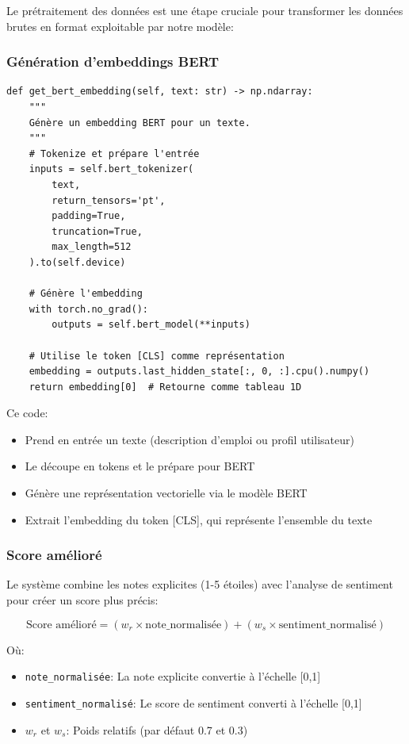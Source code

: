 \documentclass[12pt,a4paper]{article}
\begin{document}
Le prétraitement des données est une étape cruciale pour transformer les données brutes en format exploitable par notre modèle:

\subsubsection{Génération d'embeddings BERT}

\begin{lstlisting}[caption=Fonction de génération d'embedding BERT]
def get_bert_embedding(self, text: str) -> np.ndarray:
    """
    Génère un embedding BERT pour un texte.
    """
    # Tokenize et prépare l'entrée
    inputs = self.bert_tokenizer(
        text,
        return_tensors='pt',
        padding=True,
        truncation=True,
        max_length=512
    ).to(self.device)
    
    # Génère l'embedding
    with torch.no_grad():
        outputs = self.bert_model(**inputs)
        
    # Utilise le token [CLS] comme représentation
    embedding = outputs.last_hidden_state[:, 0, :].cpu().numpy()
    return embedding[0]  # Retourne comme tableau 1D
\end{lstlisting}

Ce code:
\begin{itemize}
    \item Prend en entrée un texte (description d'emploi ou profil utilisateur)
    \item Le découpe en tokens et le prépare pour BERT
    \item Génère une représentation vectorielle via le modèle BERT
    \item Extrait l'embedding du token [CLS], qui représente l'ensemble du texte
\end{itemize}

\subsubsection{Score amélioré}

Le système combine les notes explicites (1-5 étoiles) avec l'analyse de sentiment pour créer un score plus précis:

\begin{equation}
\text{Score amélioré} = (w_r \times \text{note\_normalisée}) + (w_s \times \text{sentiment\_normalisé})
\end{equation}

Où:
\begin{itemize}
    \item \texttt{note\_normalisée}: La note explicite convertie à l'échelle [0,1]
    \item \texttt{sentiment\_normalisé}: Le score de sentiment converti à l'échelle [0,1]
    \item \texttt{$w_r$} et \texttt{$w_s$}: Poids relatifs (par défaut 0.7 et 0.3)
\end{itemize}
\end{document}

